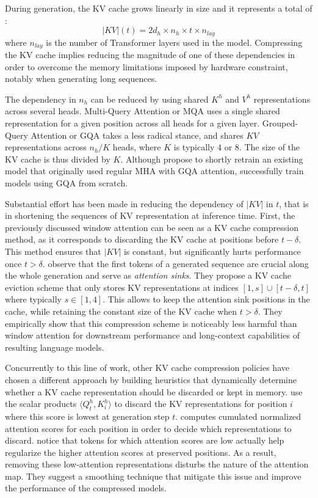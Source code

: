 During generation, the KV cache grows linearly in size and it represents a total of :
$$
|KV|(t) = 2 d_h \times n_h \times t \times n_{lay}
$$
where $n_{lay}$ is the number of Transformer layers used in the model. Compressing the KV cache implies reducing the magnitude of one of these dependencies in order to overcome the memory limitations imposed by hardware constraint, notably when generating long sequences.

The dependency in $n_h$ can be reduced by using shared $K^h$ and $V^h$ representations across several heads. Multi-Query Attention or MQA \citep{shazeer2019fasttransformerdecodingwritehead} uses a single shared representation for a given position across all heads for a given layer. Grouped-Query Attention or GQA \citep{ainslie-etal-2023-gqa} takes a less radical stance, and shares $KV$ representations across $n_h / K$ heads, where $K$ is typically $4$ or $8$. The size of the KV cache is thus divided by $K$. Although \citet{ainslie-etal-2023-gqa} propose to shortly retrain an existing model that originally used regular MHA with GQA attention, \citet{touvron2023llama} successfully train models using GQA from scratch.

Substantial effort has been made in reducing the dependency of $|KV|$ in $t$, that is in shortening the sequences of KV representation at inference time. First, the previously discussed window attention \citep{beltagy2020longformer} can be seen as a KV cache compression method, as it corresponds to discarding the KV cache at positions before $t - \delta$. This method ensures that $|KV|$ is constant, but significantly hurts performance once $t > \delta$. \citet{xiao2024efficient} observe that the first tokens of a generated sequence are crucial along the whole generation and serve as \textit{attention sinks}. They propose a KV cache eviction scheme that only stores KV representations at indices $[1, s] \cup [t-\delta, t]$ where typically $s \in [1, 4]$. This allows to keep the attention sink positions in the cache, while retaining the constant size of the KV cache when $t > \delta$. They empirically show that this compression scheme is noticeably less harmful than window attention for downstream performance and long-context capabilities of resulting language models.

Concurrently to this line of work, other KV cache compression policies have chosen a different approach by building heuristics that dynamically determine whether a KV cache representation should be discarded or kept in memory. \citet{oren2024transformersmultistaternns} use the scalar products $\langle Q^h_t, K^h_i \rangle$ to discard the KV representations for position $i$ where this score is lowest at generation step $t$. \citet{h2o} computes cumulated normalized attention scores for each position in order to decide which representations to discard. \citet{keyformer} notice that tokens for which attention scores are low actually help regularize the higher attention scores at preserved positions. As a result, removing these low-attention representations disturbs the nature of the attention map. They suggest a smoothing technique that mitigate this issue and improve the performance of the compressed models.

